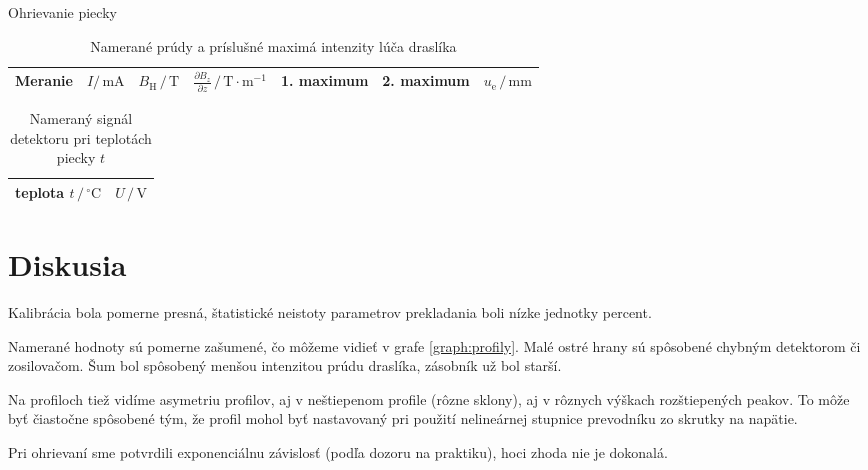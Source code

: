 \documentclass[a4paper, 10pt]{article}
\newcommand{\unit}[1]{\ensuremath{\, \mathrm{#1}}}
\newcommand{\di}[1]{\ensuremath{_\mathrm{#1}}}
\begin{document}
\begin{graph}[t]
\centering
\vspace*{-15pt}

\caption{ Ohrievanie piecky \label{graph:ohr}}
\end{graph}


\begin{table}[t]
\centering
\begin{tabular}{c|c|c|c|c|c|c}
Meranie & 
$I/\unit{mA}$&
$B\di H\,/\unit{T}$&
$\frac{\partial{B_z}}{\partial z}\,/\unit{T\cdot m^{-1}}$&
1. maximum &
2. maximum& 
$u\di e\,/\unit{mm}$
\\
\midrule 

\end{tabular}
\newline
\vspace*{2pt}
\caption{Namerané prúdy a príslušné maximá intenzity lúča draslíka\label{tab:maxima}}
\end{table}

\begin{table}[t]
\centering
\hspace*{60pt}
\begin{tabular}{c|c}
teplota $t\,/\unit{^\circ C}$ & 
$U\,/\unit{V}$
\\
\midrule 

\end{tabular}
\newline
\vspace*{2pt}
\caption{Nameraný signál detektoru pri teplotách piecky $t$ \label{tab:ohr}}
\end{table}
\section*{Diskusia}
Kalibrácia bola pomerne presná, štatistické neistoty parametrov prekladania boli nízke jednotky percent.

Namerané hodnoty sú pomerne zašumené, čo môžeme vidieť v grafe \ref{graph:profily}. Malé ostré hrany sú spôsobené chybným detektorom či zosilovačom. Šum bol spôsobený menšou intenzitou prúdu draslíka, zásobník už bol starší. 

Na profiloch tiež vidíme asymetriu profilov, aj v neštiepenom profile (rôzne sklony), aj v rôznych výškach rozštiepených peakov. To môže byť čiastočne spôsobené tým, že profil mohol byť nastavovaný pri použití nelineárnej stupnice prevodníku zo skrutky na napätie.

Pri ohrievaní sme potvrdili exponenciálnu závislosť (podľa dozoru na praktiku), hoci zhoda nie je dokonalá. 
\end{document}
